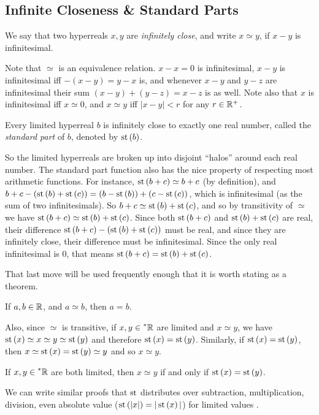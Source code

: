 \subsection{Infinite Closeness \& Standard Parts}
\begin{defn}
    We say that two hyperreals $x, y$ are \textit{infinitely close}, and write $x \simeq y$, if $x - y$ is infinitesimal.
\end{defn}

Note that $\simeq$ is an equivalence relation. $x - x = 0$ is infinitesimal, $x - y$ is infinitesimal iff $-(x - y) = y - x$ is, and whenever $x - y$ and $y - z$ are infinitesimal their sum $(x - y) + (y - z) = x - z$ is as well. Note also that $x$ is infinitesimal iff $x \simeq 0$, and $x \simeq y$ iff $|x - y| < r$ for any $r \in \mathbb{R}^+$.

\begin{thm}
    Every limited hyperreal $b$ is infinitely close to exactly one real number, called the \textit{standard part} of $b$, denoted by $\operatorname{st}\left(b\right)$.
\end{thm}

So the limited hyperreals are broken up into disjoint ``halos'' around each real number. The standard part function also has the nice property of respecting most arithmetic functions. For instance, $\operatorname{st}\left(b + c\right) \simeq b + c$ (by definition), and $b + c - (\operatorname{st}\left(b\right) + \operatorname{st}\left(c\right)) = (b - \operatorname{st}\left(b\right)) + (c - \operatorname{st}\left(c\right))$, which is infinitesimal (as the sum of two infinitesimals). So $b + c \simeq \operatorname{st}\left(b\right) + \operatorname{st}\left(c\right)$, and so by transitivity of $\simeq$ we have $\operatorname{st}\left(b + c\right) \simeq \operatorname{st}\left(b\right) + \operatorname{st}\left(c\right)$. Since both $\operatorname{st}\left(b + c\right)$ and $\operatorname{st}\left(b\right) + \operatorname{st}\left(c\right)$ are real, their difference $\operatorname{st}\left(b + c\right) - (\operatorname{st}\left(b\right) + \operatorname{st}\left(c\right))$ must be real, and since they are infinitely close, their difference must be infinitesimal. Since the only real infinitesimal is $0$, that means $\operatorname{st}\left(b+c\right) = \operatorname{st}\left(b\right)+\operatorname{st}\left(c\right)$.

That last move will be used frequently enough that it is worth stating as a theorem.
\begin{thm}
    If $a, b \in \mathbb{R}$, and $a \simeq b$, then $a = b$.
\end{thm}
Also, since $\simeq$ is transitive, if $x, y \in \prescript{*}{}{\mathbb{R}}$ are limited and $x \simeq y$, we have $\operatorname{st}\left(x\right) \simeq x \simeq y \simeq \operatorname{st}\left(y\right)$ and therefore $\operatorname{st}\left(x\right) = \operatorname{st}\left(y\right)$. Similarly, if $\operatorname{st}\left(x\right) = \operatorname{st}\left(y\right)$, then $x \simeq \operatorname{st}\left(x\right) = \operatorname{st}\left(y\right) \simeq y$ and so $x \simeq y$.
\begin{corollary}
    If $x, y \in \prescript{*}{}{\mathbb{R}}$ are both limited, then $x \simeq y$ if and only if $\operatorname{st}\left(x\right) = \operatorname{st}\left(y\right)$.
\end{corollary}
We can write similar proofs that $\operatorname{st}$ distributes over subtraction, multiplication, division, even absolute value ($\operatorname{st}\left(|x|\right) = |\operatorname{st}\left(x\right)|$) for limited values \cite[Theorem~5.6.2]{goldblatt1998}.


